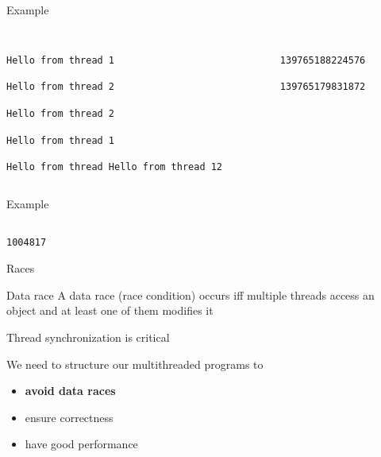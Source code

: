 \documentclass{beamer}
\begin{document}
\begin{frame}{Example}
\tiny
\begin{columns}
\begin{column}{0.5\textwidth}
\inputminted{cpp}{../code/examples/example01a.cpp}

\vspace{.25cm}
\hrulefill

\texttt{Hello from thread 1}

\texttt{Hello from thread 2}

\vspace{.25cm}
\hrulefill

\texttt{Hello from thread 2}

\texttt{Hello from thread 1}

\vspace{.25cm}
\hrulefill

\texttt{Hello from thread Hello from thread 12}
\end{column}
\begin{column}{0.5\textwidth}
\inputminted{cpp}{../code/examples/example01b.cpp}

\vspace{.25cm}
\hrulefill

\texttt{139765188224576}

\texttt{139765179831872}
\end{column}
\end{columns}
\end{frame}

\begin{frame}{Example}
\scriptsize
\inputminted{cpp}{../code/examples/example02.cpp}

\vspace{.25cm}
\hrulefill

\texttt{1004817}
\end{frame}

\begin{frame}{Races}
\begin{block}{Data race}
A data race (race condition) occurs iff multiple threads access an object and at least one of them modifies it
\end{block}

Thread synchronization is critical

We need to structure our multithreaded programs to
\begin{itemize}
\item \textbf{avoid data races}
\item ensure correctness
\item have good performance
\end{itemize}
\end{frame}
\end{document}
